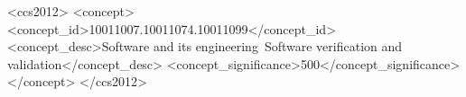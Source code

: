 \documentclass[acmsmall,nonacm]{acmart}
\newcommand{\EMPH}[1]{\emph{#1}}
\begin{document}
%
%
%

\begin{CCSXML}
<ccs2012>
<concept>
<concept_id>10011007.10011074.10011099</concept_id>
<concept_desc>Software and its engineering~Software verification and validation</concept_desc>
<concept_significance>500</concept_significance>
</concept>
</ccs2012>
\end{CCSXML}
\end{document}
